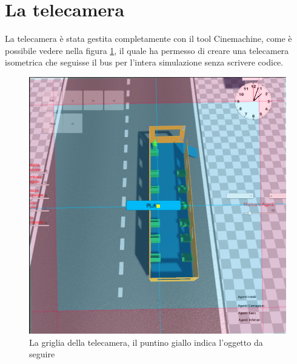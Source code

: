 \documentclass[12pt, openany]{book}
\begin{document}
 	\section{La telecamera}
 	La telecamera è stata gestita completamente con il tool Cinemachine, come è possibile vedere nella figura \ref{fig:Cinemachine}, il quale ha permesso di creare una telecamera isometrica che seguisse il bus per l'intera simulazione senza scrivere codice.
 	\begin{figure}[H]
 		\centering
 		\includegraphics[width=0.7\linewidth]{"Immagini/Cinemachine.png"}
 		\caption{La griglia della telecamera, il puntino giallo indica l'oggetto da seguire}
 		\label{fig:Cinemachine}
 	\end{figure}
\end{document}
